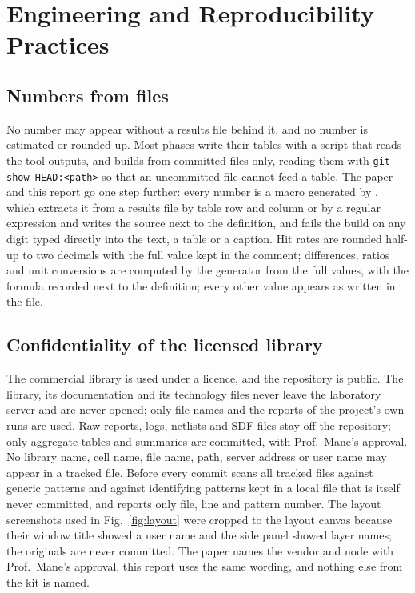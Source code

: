 \documentclass[11pt,a4paper]{report}
\begin{document}
\chapter{Engineering and Reproducibility Practices}\label{ch:practice}
\section{Numbers from files}
No number may appear without a results file behind it, and no number is estimated or rounded up. Most phases write their tables with a script that reads the tool outputs, and  builds  from committed files only, reading them
with \texttt{git show HEAD:<path>} so that an uncommitted file cannot feed a table. The paper and this report go one
step further: every number is a macro generated by , which extracts it from a
results file by table row and column or by a regular expression and writes the source next to the definition, and
 fails the build on any digit typed directly into the text, a table or a caption.
Hit rates are rounded half-up to two decimals with the full value kept in the comment; differences, ratios and unit conversions are computed by the generator from the full values, with the formula recorded next to the definition; every other value appears as written in the file. 

\section{Confidentiality of the licensed library}
The commercial library is used under a licence, and the repository is public. The library, its documentation and its
technology files never leave the laboratory server and are never opened; only file names and the reports of the project's own runs are used. Raw reports, logs, netlists and SDF files stay off the repository; only aggregate tables and summaries
are committed, with Prof.\ Mane's approval. No library name, cell name, file name, path, server address or user name
may appear in a tracked file. Before every commit  scans all tracked files against
generic patterns and against identifying patterns kept in a local file that is itself never committed, and reports only file, line and pattern number. The layout screenshots used in
Fig.~\ref{fig:layout} were cropped to the layout canvas because their window title showed a user name and the side
panel showed layer names; the originals are never committed. The paper names the vendor and node with Prof.\ Mane's approval, this report uses the same wording, and nothing else from the kit is named.
\end{document}
